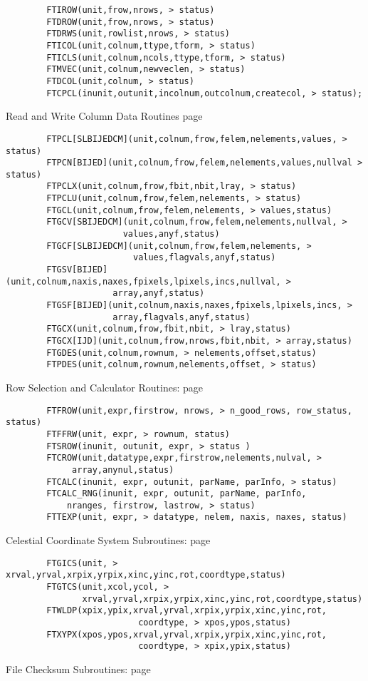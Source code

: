 \documentclass[11pt]{book}
\begin{document}
\begin{verbatim}
        FTIROW(unit,frow,nrows, > status)
        FTDROW(unit,frow,nrows, > status)
        FTDRWS(unit,rowlist,nrows, > status)
        FTICOL(unit,colnum,ttype,tform, > status)
        FTICLS(unit,colnum,ncols,ttype,tform, > status)
        FTMVEC(unit,colnum,newveclen, > status)
        FTDCOL(unit,colnum, > status)
        FTCPCL(inunit,outunit,incolnum,outcolnum,createcol, > status);
\end{verbatim}
 Read and Write Column Data Routines page~\pageref{FTPCLS}

\begin{verbatim}
        FTPCL[SLBIJEDCM](unit,colnum,frow,felem,nelements,values, > status)
        FTPCN[BIJED](unit,colnum,frow,felem,nelements,values,nullval > status)
        FTPCLX(unit,colnum,frow,fbit,nbit,lray, > status)
        FTPCLU(unit,colnum,frow,felem,nelements, > status)
        FTGCL(unit,colnum,frow,felem,nelements, > values,status)
        FTGCV[SBIJEDCM](unit,colnum,frow,felem,nelements,nullval, >
                       values,anyf,status)
        FTGCF[SLBIJEDCM](unit,colnum,frow,felem,nelements, >
                         values,flagvals,anyf,status)
        FTGSV[BIJED](unit,colnum,naxis,naxes,fpixels,lpixels,incs,nullval, >
                     array,anyf,status)
        FTGSF[BIJED](unit,colnum,naxis,naxes,fpixels,lpixels,incs, >
                     array,flagvals,anyf,status)
        FTGCX(unit,colnum,frow,fbit,nbit, > lray,status)
        FTGCX[IJD](unit,colnum,frow,nrows,fbit,nbit, > array,status)
        FTGDES(unit,colnum,rownum, > nelements,offset,status)
        FTPDES(unit,colnum,rownum,nelements,offset, > status)
\end{verbatim}
 Row Selection and Calculator Routines: page~\pageref{FTFROW}

\begin{verbatim}
        FTFROW(unit,expr,firstrow, nrows, > n_good_rows, row_status, status)
        FTFFRW(unit, expr, > rownum, status)
        FTSROW(inunit, outunit, expr, > status )
        FTCROW(unit,datatype,expr,firstrow,nelements,nulval, >
             array,anynul,status)
        FTCALC(inunit, expr, outunit, parName, parInfo, > status)
        FTCALC_RNG(inunit, expr, outunit, parName, parInfo,
            nranges, firstrow, lastrow, > status)
        FTTEXP(unit, expr, > datatype, nelem, naxis, naxes, status)
\end{verbatim}
 Celestial Coordinate System Subroutines: page~\pageref{FTGICS}

\begin{verbatim}
        FTGICS(unit, > xrval,yrval,xrpix,yrpix,xinc,yinc,rot,coordtype,status)
        FTGTCS(unit,xcol,ycol, >
               xrval,yrval,xrpix,yrpix,xinc,yinc,rot,coordtype,status)
        FTWLDP(xpix,ypix,xrval,yrval,xrpix,yrpix,xinc,yinc,rot,
                          coordtype, > xpos,ypos,status)
        FTXYPX(xpos,ypos,xrval,yrval,xrpix,yrpix,xinc,yinc,rot,
                          coordtype, > xpix,ypix,status)
\end{verbatim}
 File Checksum Subroutines: page~\pageref{FTPCKS}
\end{document}
